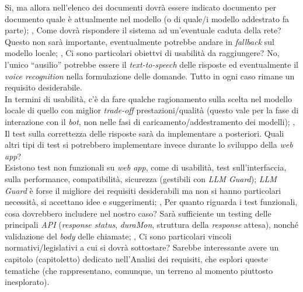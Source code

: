{{}
{Si, ma allora nell’elenco dei documenti dovrà essere indicato documento per documento quale è attualmente nel modello (o di quale/i modello addestrato fa parte);
},
\domris
{Come dovrà rispondere il sistema ad un'eventuale caduta della rete?
}
{Questo non sarà importante, eventualmente potrebbe andare in \textit{fallback} sul modello locale;
},
\domris
{Ci sono particolari obiettvi di usabilità da raggiungere?
}
{No, l’unico “ausilio” potrebbe essere il \textit{text-to-speech} delle risposte ed eventualmente il \textit{voice recognition} nella formulazione delle domande. Tutto in ogni caso rimane un requisito desiderabile.\\ In termini di usabilità, c'è da fare qualche ragionamento sulla scelta nel modello locale di quello con miglior \textit{trade-off} prestazioni/qualità (questo vale per la fase di interazione con il \textit{bot}, non nelle fasi di caricamento/addestramento dei modelli);
},
\domris
{Il test sulla correttezza delle risposte sarà da implementare a posteriori. Quali altri tipi di test si potrebbero implementare invece durante lo sviluppo della \textit{web app}?\\Esistono test non funzionali su \textit{web app}, come di usabilità, test sull’interfaccia, sulla performance, compatibilità, sicurezza (gestibili con \textit{LLM Guard});
}
{\textit{LLM Guard} è forse il migliore dei requisiti desiderabili ma non si hanno particolari necessità, si accettano idee e suggerimenti;
},
\domris
{Per quanto riguarda i test funzionali, cosa dovrebbero includere nel nostro caso?
}
{Sarà sufficiente un testing delle principali \textit{API} (\textit{response status}, \textit{duraMon}, struttura della \textit{response} attesa), nonché validazione del \textit{body} delle chiamate;
},
\domris
{Ci sono particolari vincoli normativi/legislativi a cui si dovrà sottostare?
}
{Sarebbe interessante avere un capitolo (capitoletto) dedicato nell’Analisi dei requisiti, che esplori queste tematiche (che rappresentano, comunque, un terreno al momento piuttosto inesplorato).
}
}



